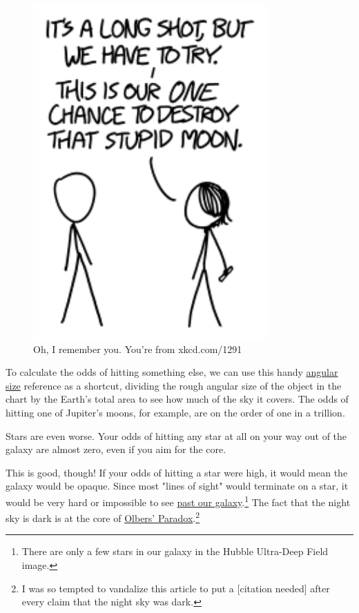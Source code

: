 {\begin{figure}[!htbp]
\centering
\includegraphics[scale=0.5, max width=0.8\textwidth]{imgs/a/109/try.png}
\caption{Oh, I remember you. You're from xkcd.com/1291}
\end{figure}

{To calculate the odds of hitting something else, we can use this handy \href{http://xkcd.com/1276/}{angular size} reference as a shortcut, dividing the rough angular size of the object in the chart by the Earth's total area to see how much of the sky it covers. The odds of hitting one of Jupiter's moons, for example, are on the order of one in a trillion.}

{Stars are even worse. Your odds of hitting any star at all on your way out of the galaxy are almost zero, even if you aim for the core.}

{This is good, though! If your odds of hitting a star were high, it would mean the galaxy would be opaque. Since most "lines of sight" would terminate on a star, it would be very hard or impossible to see \href{https://en.wikipedia.org/wiki/Hubble\_Ultra-Deep\_Field}{past our galaxy}.{\footnote{There are only a few stars in our galaxy in the Hubble Ultra-Deep Field image.} } The fact that the night sky is dark is at the core of \href{https://en.wikipedia.org/wiki/Olbers'\_paradox} {Olbers' Paradox}.{\footnote{I was so tempted to vandalize this article to put a [citation needed] after every claim that the night sky was dark.} } }

}
